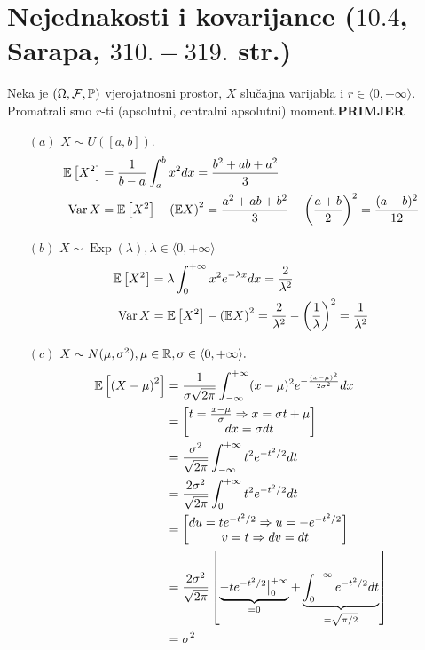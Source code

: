 \documentclass{article}
\newcommand{\Var}{\operatorname{Var}}
\newcommand{\Exp}{\operatorname{Exp}}
\begin{document}
\section{Nejednakosti i kovarijance (\textsection \(10.4\), Sarapa, \(310.-319.\) str.)}
Neka je \(\left(\Omega,\mathcal F,\Bbb P\right)\) vjerojatnosni prostor, \(X\) slučajna varijabla i \(r\in\langle 0,+\infty\rangle.\) Promatrali smo \(r\)-ti (apsolutni, centralni apsolutni) moment.\newline\newline \textbf{PRIMJER}
\begin{enumerate}
    \item[\((a)\)] \(X\sim U\left([a,b]\right).\) \[\begin{aligned}\Bbb E\left[X^2\right]&=\frac1{b-a}\int_a^bx^2dx=\frac{b^2+ab+a^2}3\\\Var X&=\Bbb E\left[X^2\right]-\left(\Bbb EX\right)^2=\frac{a^2+ab+b^2}3-\left(\frac{a+b}2\right)^2=\frac{(a-b)^2}{12}\end{aligned}\]
    \item[\((b)\)] \(X\sim\Exp(\lambda),\lambda\in\langle 0,+\infty\rangle\) \[\begin{aligned}\Bbb E\left[X^2\right]&=\lambda\int_0^{+\infty}x^2e^{-\lambda x}dx=\frac2{\lambda^2}\\\Var X&=\Bbb E\left[X^2\right]-\left(\Bbb EX\right)^2=\frac2{\lambda^2}-\left(\frac1\lambda\right)^2=\frac1{\lambda^2}\end{aligned}\]
    \item[\((c)\)] \(X\sim N(\mu,\sigma^2),\mu\in\Bbb R,\sigma\in\langle 0,+\infty\rangle.\) \[\begin{aligned}\Bbb E\left[\left(X-\mu\right)^2\right]&=\frac1{\sigma\sqrt{2\pi}}\int_{-\infty}^{+\infty}(x-\mu)^2e^{-\frac{(x-\mu)^2}{2\sigma^2}}dx\\&=\begin{bmatrix}t=\frac{x-\mu}\sigma\Rightarrow x=\sigma t+\mu\\dx=\sigma dt\end{bmatrix}\\&=\frac{\sigma^2}{\sqrt{2\pi}}\int_{-\infty}^{+\infty}t^2e^{-t^2/2}dt\\&=\frac{2\sigma^2}{\sqrt{2\pi}}\int_0^{+\infty}t^2e^{-t^2/2}dt\\&=\begin{bmatrix}du=te^{-t^2/2}\Rightarrow u=-e^{-t^2/2}\\v=t\Rightarrow dv=dt\end{bmatrix}\\&=\frac{2\sigma^2}{\sqrt{2\pi}}\left[\underbrace{-te^{-t^2/2}\big|_0^{+\infty}}_{=0}+\underbrace{\int_0^{+\infty}e^{-t^2/2}dt}_{=\sqrt{\pi/2}}\right]\\&=\sigma^2\end{aligned}\]

\end{enumerate}
\end{document}
